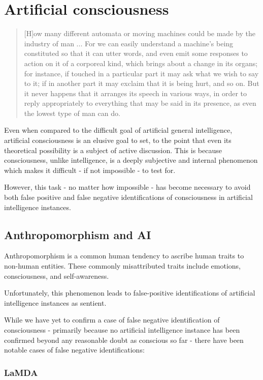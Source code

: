 \documentclass[masterthesis]{fer}
\begin{document}
\section{Artificial consciousness}
\begin{quote}
[H]ow many different automata or moving machines could be made by the industry of man ... For we can easily understand a machine's being constituted so that it can utter words, and even emit some responses to action on it of a corporeal kind, which brings about a change in its organs; for instance, if touched in a particular part it may ask what we wish to say to it; if in another part it may exclaim that it is being hurt, and so on. But it never happens that it arranges its speech in various ways, in order to reply appropriately to everything that may be said in its presence, as even the lowest type of man can do.
\end{quote}
Even when compared to the difficult goal of artificial general intelligence, artificial consciousness is an elusive goal to set, to the point that even its theoretical possibility is a subject of active discussion.
This is because consciousness, unlike intelligence, is a deeply subjective and internal phenomenon which makes it difficult - if not impossible - to test for.

However, this task - no matter how impossible - has become necessary to avoid both false positive and false negative identifications of consciousness in artificial intelligence instances.

\subsection{Anthropomorphism and AI}

Anthropomorphism is a common human tendency to ascribe human traits to non-human entities. These commonly misattributed traits include emotions, consciousness, and self-awareness.

Unfortunately, this phenomenon leads to false-positive identifications of artificial intelligence instances as sentient.

While we have yet to confirm a case of false negative identification of consciousness - primarily because no artificial intelligence instance has been confirmed beyond any reasonable doubt as conscious so far - there have been notable cases of false negative identifications:

\subsubsection{LaMDA}
\end{document}
